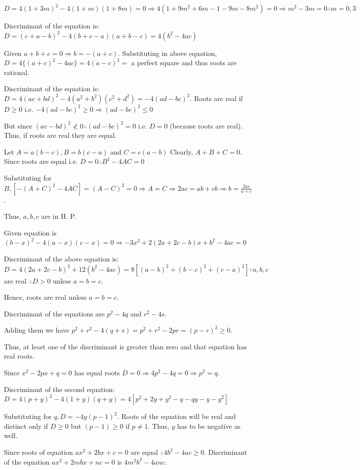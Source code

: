    $D = 4(1 + 3m)^2 - 4(1 + m)(1 + 8m) = 0\Rightarrow 4(1 + 9m^2 + 6m - 1 - 9m -8m^2) = 0\Rightarrow m^2 -
  3m = 0 \therefore m = 0, 3$
\item Discriminant of the equation is: $D = (c + a - b)^2 - 4(b + c - a)(a + b -c) = 4(b^2 - 4ac)$

  Given $a + b + c = 0 \Rightarrow b = -(a + c).$ Substituting in above equation, $D = 4\{(a + c)^2 - 4ac\}
  = 4(a - c)^2 =$ a perfect square and thus roots are rational.
\item Discriminant of the equation is: $D = 4(ac + bd)^2 - 4(a^2 + b^2)(c^2 + d^2) = -4(ad - bc)^2$. Roots
  are real if $D\geq 0$ i.e. $-4(ad - bc)^2 \geq 0 \Rightarrow (ad - bc)^2 \leq 0$

  But since $(ac - bd)^2 \nless 0 \therefore (ad - bc)^2 = 0$ i.e. $D = 0$ (because roots are real). Thus,
  if roots are real they are equal.
\item Let $A = a(b - c), B = b(c - a)$ and $C = c(a - b)$ Clearly, $A + B + C = 0$. Since roots are equal
  i.e. $D = 0 \therefore B^2 - 4AC = 0$

  Substituting for $B, [-(A + C)^2 - 4AC] = (A - C)^2 = 0 \Rightarrow A = C \Rightarrow 2ac = ab + cb
  \Rightarrow b = \frac{2ac}{a + c}$.

  Thus, $a, b, c$ are in H. P.
\item Given equation is $(b - x)^2 - 4(a - x)(c - x) = 0\Rightarrow -3x^2 + 2(2a + 2c - b)x + b^2 - 4ac = 0$

  Discriminant of the above equation is: $D = 4(2a + 2c - b)^2 + 12(b^2 - 4ac) = 8[(a - b)^2 + (b - c)^2 +
    (c - a)^2]\because a, b, c$ are real $\therefore D > 0$ unless $a = b = c$.

  Hence, roots are real unless $a = b = c$.
\item Discriminant of the equations are $p^2 - 4q$ and $r^2 - 4s$.

  Adding them we have $p^2 + r^2 - 4(q + s) = p^2 + r^2 - 2pr = (p - r)^2 \geq 0$.

  Thus, at least one of the discriminant is greater than zero and that equation has real roots.
\item Since $x^2 - 2px + q = 0$ has equal roots $D = 0 \Rightarrow 4p^2 - 4q = 0 \Rightarrow p^2 = q$.

  Discriminant of the second equation: $D = 4(p + y)^2 - 4(1 + y)(q + y) = 4[p^2 + 2y + y^2 - q -qy -y - y^2]$

  Substituting for $q, D = -4y(p - 1)^2$. Roots of the equation will be real and distinct only if $D \geq
  0$ but $(p - 1) \geq 0$ if $p \neq 1$. Thus, $y$ has to be negative as well.
\item Since roots of equation $ax^2 + 2bx + c = 0$ are equal $\therefore 4b^2 - 4ac \geq 0$. Discriminant of
  the equation $ax^2 + 2mbx + nc = 0$ is $4m^2b^2 - 4anc$.

